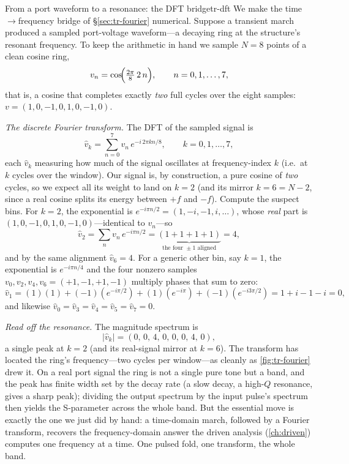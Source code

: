 \begin{workedexample}{From a port waveform to a resonance: the DFT bridge}{tr-dft}
We make the time$\to$frequency bridge of \S\ref{sec:tr-fourier} numerical. Suppose a
transient march produced a sampled port-voltage waveform---a decaying ring at the
structure's resonant frequency. To keep the arithmetic in hand we sample $N=8$
points of a clean cosine ring,
\[
  v_n=\cos\!\Bigl(\tfrac{2\pi}{8}\,2\,n\Bigr),\qquad n=0,1,\dots,7,
\]
that is, a cosine that completes exactly \emph{two} full cycles over the eight
samples: $v=(1,0,-1,0,1,0,-1,0)$.

\medskip
\emph{The discrete Fourier transform.} The DFT of the sampled signal is
\[
  \hat v_k=\sum_{n=0}^{7} v_n\,e^{-i\,2\pi kn/8},\qquad k=0,1,\dots,7,
\]
each $\hat v_k$ measuring how much of the signal oscillates at frequency-index $k$
(i.e.\ at $k$ cycles over the window). Our signal is, by construction, a pure cosine
of \emph{two} cycles, so we expect all its weight to land on $k=2$ (and its mirror
$k=6=N-2$, since a real cosine splits its energy between $+f$ and $-f$). Compute the
suspect bins. For $k=2$, the exponential is $e^{-i\pi n/2}=(1,-i,-1,i,\dots)$, whose
\emph{real} part is $(1,0,-1,0,1,0,-1,0)$---identical to $v_n$---so
\[
  \hat v_2=\sum_{n}v_n\,e^{-i\pi n/2}
         =\underbrace{(1+1+1+1)}_{\text{the four }\pm1\text{ aligned}}=4,
\]
and by the same alignment $\hat v_6=4$. For a generic other bin, say $k=1$, the
exponential is $e^{-i\pi n/4}$ and the four nonzero samples
$v_0,v_2,v_4,v_6=(+1,-1,+1,-1)$ multiply phases that sum to zero:
\[
  \hat v_1=(1)(1)+(-1)(e^{-i\pi/2})+(1)(e^{-i\pi})+(-1)(e^{-i3\pi/2})
         =1+i-1-i=0,
\]
and likewise $\hat v_0=\hat v_3=\hat v_4=\hat v_5=\hat v_7=0$.

\medskip
\emph{Read off the resonance.} The magnitude spectrum is
\[
  |\hat v_k|=(0,\,0,\,4,\,0,\,0,\,0,\,4,\,0),
\]
a single peak at $k=2$ (and its real-signal mirror at $k=6$). The transform has
located the ring's frequency---two cycles per window---as cleanly as
\cref{fig:tr-fourier} drew it. On a real port signal the ring is not a single pure
tone but a band, and the peak has finite width set by the decay rate (a slow decay,
a high-$Q$ resonance, gives a sharp peak); dividing the output spectrum by the input
pulse's spectrum then yields the S-parameter across the whole band. But the essential
move is exactly the one we just did by hand: a time-domain march, followed by a
Fourier transform, recovers the frequency-domain answer the driven analysis
(\cref{ch:driven}) computes one frequency at a time. One pulsed fold, one transform,
the whole band.
\end{workedexample}

